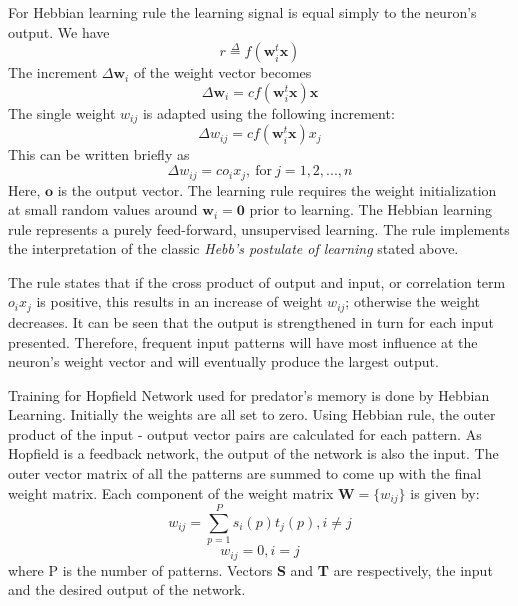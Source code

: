 \documentclass[letterpaper]{article}
\numberwithin{equation}{section}
\begin{document}
For Hebbian learning rule the learning signal is equal simply to the neuron's output. We have
\begin{equation}
	r \overset{\Delta}{=} f(\textbf{w}_i^t \textbf{x})
\end{equation}
The increment \(\Delta\textbf{w}_i\) of the weight vector becomes
\begin{equation}
	\Delta\textbf{w}_i = cf(\textbf{w}_i^t \textbf{x})\textbf{x}
\end{equation}
The single weight \( w_{ij} \) is adapted using the following increment:
\begin{equation}
	\Delta\textit{w}_{ij} = cf(\textbf{w}_i^t \textbf{x})x_j
\end{equation}
This can be written briefly as 
\begin{equation}
	\Delta\textit{w}_{ij} = c o_i x_j, \> \text{for} \> j = 1, 2, ..., n
\end{equation}
Here, \(\textbf{o}\) is the output vector. The learning rule requires the weight initialization at small random values around \( \textbf{w}_i = \textbf{0}\) prior to learning. The Hebbian learning rule represents a purely feed-forward, unsupervised learning. The rule implements the interpretation of the classic \textit{Hebb's postulate of learning} stated above. 

The rule states that if the cross product of output and input, or correlation term \(o_ix_j\) is positive, this results in an increase of weight \(w_{ij}\); otherwise the weight decreases. It can be seen that the output is strengthened in turn for each input presented. Therefore, frequent input patterns will have most influence at the neuron's weight vector and will eventually produce the largest output.

Training for Hopfield Network used for predator's memory is done by Hebbian Learning. Initially the weights are all set to zero. Using Hebbian rule, the outer product of the input - output vector pairs are calculated for each pattern. As Hopfield is a feedback network, the output of the network is also the input. The outer vector matrix of all the patterns are summed to come up with the final weight matrix. Each component of the weight matrix \(\textbf{W} = \{w_{ij}\}\) is given by:
\begin{equation}
w_{ij} = \sum_{p=1}^{P} s_i(p) t_j(p), i \neq j
\end{equation}
\[
w_{ij} = 0, i = j
\]
where P is the number of patterns. Vectors \textbf{S} and \textbf{T} are respectively, the input and the desired output of the network.
\end{document}
